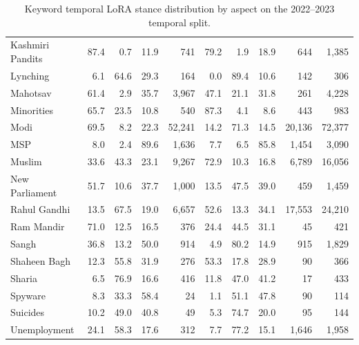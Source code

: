 \begin{table}[htbp]
\begin{tabular}{lrrrrrrrrr}
Kashmiri Pandits & 87.4 & 0.7 & 11.9 & 741 & 79.2 & 1.9 & 18.9 & 644 & 1,385 \\
Lynching & 6.1 & 64.6 & 29.3 & 164 & 0.0 & 89.4 & 10.6 & 142 & 306 \\
Mahotsav & 61.4 & 2.9 & 35.7 & 3,967 & 47.1 & 21.1 & 31.8 & 261 & 4,228 \\
Minorities & 65.7 & 23.5 & 10.8 & 540 & 87.3 & 4.1 & 8.6 & 443 & 983 \\
Modi & 69.5 & 8.2 & 22.3 & 52,241 & 14.2 & 71.3 & 14.5 & 20,136 & 72,377 \\
MSP & 8.0 & 2.4 & 89.6 & 1,636 & 7.7 & 6.5 & 85.8 & 1,454 & 3,090 \\
Muslim & 33.6 & 43.3 & 23.1 & 9,267 & 72.9 & 10.3 & 16.8 & 6,789 & 16,056 \\
New Parliament & 51.7 & 10.6 & 37.7 & 1,000 & 13.5 & 47.5 & 39.0 & 459 & 1,459 \\
Rahul Gandhi & 13.5 & 67.5 & 19.0 & 6,657 & 52.6 & 13.3 & 34.1 & 17,553 & 24,210 \\
Ram Mandir & 71.0 & 12.5 & 16.5 & 376 & 24.4 & 44.5 & 31.1 & 45 & 421 \\
Sangh & 36.8 & 13.2 & 50.0 & 914 & 4.9 & 80.2 & 14.9 & 915 & 1,829 \\
Shaheen Bagh & 12.3 & 55.8 & 31.9 & 276 & 53.3 & 17.8 & 28.9 & 90 & 366 \\
Sharia & 6.5 & 76.9 & 16.6 & 416 & 11.8 & 47.0 & 41.2 & 17 & 433 \\
Spyware & 8.3 & 33.3 & 58.4 & 24 & 1.1 & 51.1 & 47.8 & 90 & 114 \\
Suicides & 10.2 & 49.0 & 40.8 & 49 & 5.3 & 74.7 & 20.0 & 95 & 144 \\
Unemployment & 24.1 & 58.3 & 17.6 & 312 & 7.7 & 77.2 & 15.1 & 1,646 & 1,958 \\
\bottomrule
\end{tabular}
\caption{Keyword temporal LoRA stance distribution by aspect on the 2022--2023 temporal split.}
\label{tab:temporal-lora-keyword-stance}
\end{table}
